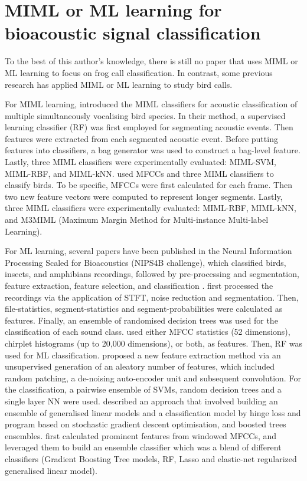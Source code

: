\section{MIML or ML learning for bioacoustic signal classification}
To the best of this author's knowledge, there is still no paper that uses MIML or ML learning to focus on frog call classification. In contrast, some previous research has applied MIML or ML learning to study bird calls.

For MIML learning, \citet{briggs2012acoustic} introduced the MIML classifiers for acoustic classification of multiple simultaneously vocalising bird species. In their method, a supervised learning classifier (RF) was first employed for segmenting acoustic events. Then features were extracted from each segmented acoustic event. Before putting features into classifiers, a bag generator was used to construct a bag-level feature. Lastly, three MIML classifiers were experimentally evaluated: MIML-SVM, MIML-RBF, and MIML-kNN.
\citet{dufour2013multi} used MFCCs and three MIML classifiers to classify birds. To be specific, MFCCs were first calculated for each frame. Then two new feature vectors were computed to represent longer segments.
Lastly, three MIML classifiers were experimentally evaluated: MIML-RBF, MIML-kNN, and M3MIML (Maximum Margin Method for Multi-instance Multi-label Learning). 

For ML learning, several papers have been published in the Neural Information Processing Scaled for Bioacoustics (NIPS4B challenge), which classified birds, insects, and amphibians recordings, followed by pre-processing and segmentation, feature extraction, feature selection, and classification \citep{lasseck2013bird, stowell2013feature, mencia2013learning, massaronensemble, chen2013novel}. \citet{lasseck2013bird} first processed the recordings via the application of STFT, noise reduction and segmentation. Then, file-statistics, segment-statistics and segment-probabilities were calculated as  features. Finally, an ensemble of randomised decision trees was used for the classification of each sound class. \citet{stowell2013feature} used either MFCC statistics (52 dimensions), chirplet histograms (up to 20,000 dimensions), or both, as  features. Then, RF was used for ML classification. \citet{mencia2013learning} proposed a new feature extraction method via an unsupervised generation of an aleatory number of features, which included random patching, a de-noising auto-encoder unit and subsequent convolution. For the classification, a pairwise ensemble of SVMs, random decision trees and a single layer NN were used. \citet{massaronensemble} described an approach that involved building an ensemble of generalised linear models and a classification model by hinge loss and program based on stochastic gradient descent optimisation, and boosted trees ensembles. 
\citet{chen2013novel} first calculated prominent features from windowed MFCCs, and leveraged them to build an ensemble classifier which was a blend of different classifiers (Gradient Boosting Tree models, RF, Lasso and elastic-net regularized generalised linear model).




